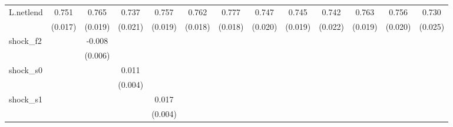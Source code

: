 {\begin{tabular}{l*{12}{c}}
\addlinespace
L.netlend   &       0.751\sym{***}&       0.765\sym{***}&       0.737\sym{***}&       0.757\sym{***}&       0.762\sym{***}&       0.777\sym{***}&       0.747\sym{***}&       0.745\sym{***}&       0.742\sym{***}&       0.763\sym{***}&       0.756\sym{***}&       0.730\sym{***}\\
            &     (0.017)         &     (0.019)         &     (0.021)         &     (0.019)         &     (0.018)         &     (0.018)         &     (0.020)         &     (0.019)         &     (0.022)         &     (0.019)         &     (0.020)         &     (0.025)         \\
\addlinespace
shock\_f2    &                     &      -0.008         &                     &                     &                     &                     &                     &                     &                     &                     &                     &                     \\
            &                     &     (0.006)         &                     &                     &                     &                     &                     &                     &                     &                     &                     &                     \\
\addlinespace
shock\_s0    &                     &                     &       0.011\sym{**} &                     &                     &                     &                     &                     &                     &                     &                     &                     \\
            &                     &                     &     (0.004)         &                     &                     &                     &                     &                     &                     &                     &                     &                     \\
\addlinespace
shock\_s1    &                     &                     &                     &       0.017\sym{***}&                     &                     &                     &                     &                     &                     &                     &                     \\
            &                     &                     &                     &     (0.004)         &                     &                     &                     &                     &                     &                     &                     &                     \\

\end{tabular}}
